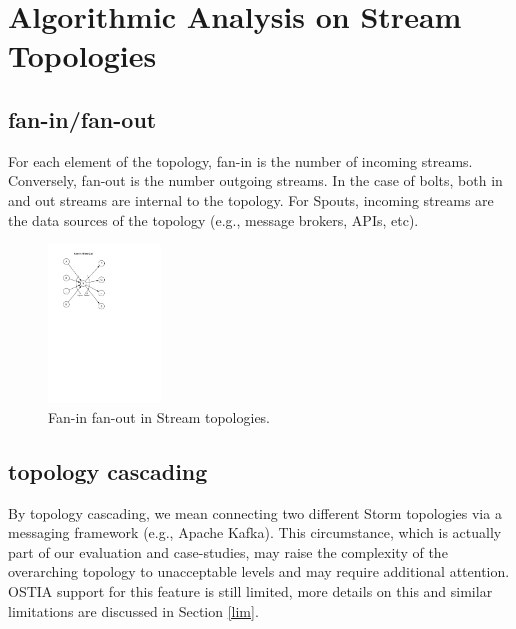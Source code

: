 \section{Algorithmic Analysis on Stream Topologies}\label{algo}

\subsection{fan-in/fan-out}

For each element of the topology, fan-in is the number of incoming
streams. Conversely, fan-out is the number outgoing streams. In the case of
bolts, both in and out streams are internal to the topology. For Spouts,
incoming streams are the data sources of the topology (e.g., message brokers,
APIs, etc).

\begin{figure}[H]
	\begin{center}
		\includegraphics[width=3cm]{images/fan-in-out}
		\caption{Fan-in fan-out in Stream topologies.}
		\label{fig:fan}
	\end{center}
\end{figure}

\subsection{topology cascading}

By topology cascading, we mean connecting two different Storm topologies via a messaging framework (e.g., Apache Kafka). This circumstance, which is actually part of our evaluation and case-studies, may raise the complexity of the overarching topology to unacceptable levels and may require additional attention. OSTIA support for this feature is still limited, more details on this and similar limitations are discussed in Section \ref{lim}.

